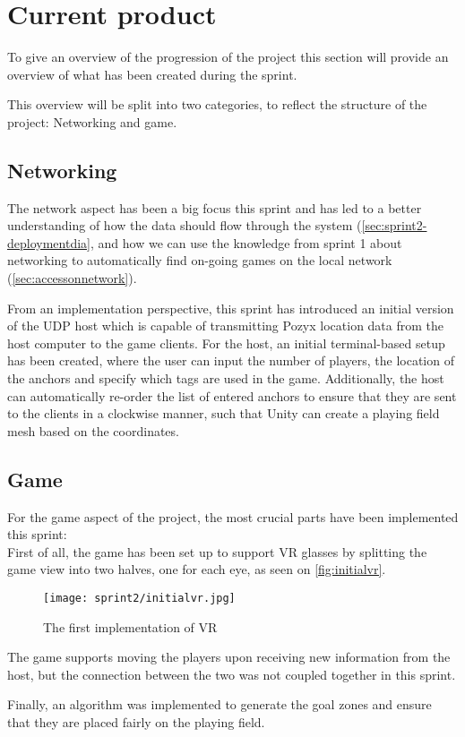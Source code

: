 \section{Current product}
To give an overview of the progression of the project this section will provide an overview of what has been created during the sprint.

This overview will be split into two categories, to reflect the structure of the project: Networking and game.

\subsection{Networking}
The network aspect has been a big focus this sprint and has led to a better understanding of how the data should flow through the system (\autoref{sec:sprint2-deploymentdia}, and how we can use the knowledge from sprint 1 about networking to automatically find on-going games on the local network (\autoref{sec:accessonnetwork}).

From an implementation perspective, this sprint has introduced an initial version of the UDP host which is capable of transmitting Pozyx location data from the host computer to the game clients.
For the host, an initial terminal-based setup has been created, where the user can input the number of players, the location of the anchors and specify which tags are used in the game.
Additionally, the host can automatically re-order the list of entered anchors to ensure that they are sent to the clients in a clockwise manner, such that Unity can create a playing field mesh based on the coordinates.

\subsection{Game}
For the game aspect of the project, the most crucial parts have been implemented this sprint:\\
First of all, the game has been set up to support VR glasses by splitting the game view into two halves, one for each eye, as seen on \autoref{fig:initialvr}.

\begin{figure}[H]
    \centering
    \texttt{[image: sprint2/initialvr.jpg]}
    \caption{The first implementation of VR}
    \label{fig:initialvr}
\end{figure}

The game supports moving the players upon receiving new information from the host, but the connection between the two was not coupled together in this sprint.

Finally, an algorithm was implemented to generate the goal zones and ensure that they are placed fairly on the playing field.
